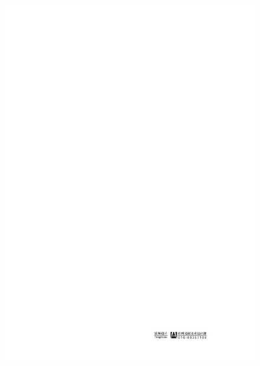 \documentclass[UTF8, fontset = sourcesans, a4paper, oneside, zihao =
-4, scheme=chinese, no-math, space=true]{ctexbook}
\makeatletter
\def\maxwidth{\ifdim\Gin@nat@width>\linewidth\linewidth
\else\Gin@nat@width\fi}
\let\Oldincludegraphics\includegraphics
\renewcommand{\includegraphics}[1]{\Oldincludegraphics[width=\maxwidth]{#1}}
\makeatother
\begin{document}
\begin{figure}[!tbp]
  \centering
\includegraphics{images/00005.jpeg}
\end{figure}

\protect\hypertarget{part0016.html}{}{}
\end{document}
